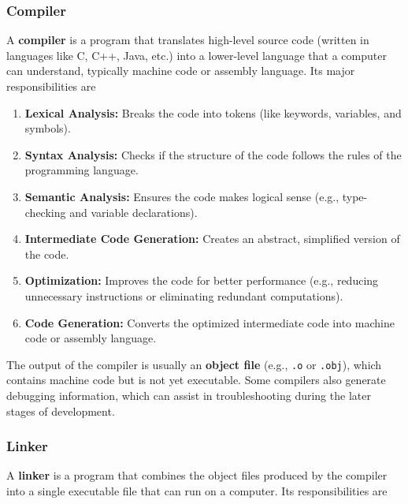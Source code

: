 \documentclass[../main]{subfiles}
\begin{document}
\subsubsection{Compiler}
    A \textbf{compiler} is a program that translates high-level source code
(written in languages like C, C++, Java, etc.) into a lower-level language that
a computer can understand, typically machine code or assembly language.
Its major responsibilities are
\begin{enumerate}
    \item \textbf{Lexical Analysis:} Breaks the code into tokens (like keywords, variables, and symbols).
    \item \textbf{Syntax Analysis:} Checks if the structure of the code follows the rules of the programming language.
    \item \textbf{Semantic Analysis:} Ensures the code makes logical sense (e.g., type-checking and variable declarations).
    \item \textbf{Intermediate Code Generation:} Creates an abstract, simplified version of the code.
    \item \textbf{Optimization:} Improves the code for better performance (e.g., reducing unnecessary instructions or eliminating redundant computations).
    \item \textbf{Code Generation:} Converts the optimized intermediate code into machine code or assembly language.
\end{enumerate}

    The output of the compiler is usually an \textbf{object file}
(e.g., \texttt{.o} or \texttt{.obj}), which contains machine code but
is not yet executable. Some compilers also generate debugging information,
which can assist in troubleshooting during the later stages of development.

\subsubsection{Linker}
    A \textbf{linker} is a program that combines the object files
produced by the compiler into a single executable file that can run on a computer. Its responsibilities are
\end{document}

